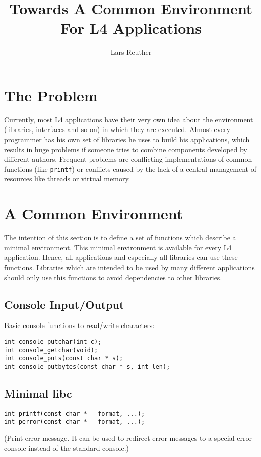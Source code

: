 \documentclass[twocolumn,10pt]{article}
\title{Towards A Common Environment For L4 Applications}
\author{Lars Reuther}
\date{}
\begin{document}
\maketitle

\section{The Problem}

Currently, most L4 applications have their very own idea about the
environment (libraries, interfaces and so on) in which they are
executed. Almost every programmer has his own set of libraries he uses
to build his applications, which results in huge problems if someone
tries to combine components developed by different authors. Frequent
problems are conflicting implementations of common functions (like
{\tt printf}) or conflicts caused by the lack of a central management
of resources like threads or virtual memory. 
  
\section{A Common Environment}

The intention of this section is to define a set of functions which
describe a minimal environment. This minimal environment is available
for every L4 application. Hence, all applications and especially all
libraries can use these functions. Libraries which are intended to be
used by many different applications should only use this functions to
avoid dependencies to other libraries.

\subsection{Console Input/Output}

Basic console functions to read/write characters:
\begin{Verbatim}[fontsize=\small]
int console_putchar(int c);
int console_getchar(void);
int console_puts(const char * s);
int console_putbytes(const char * s, int len);
\end{Verbatim}

\subsection{Minimal libc}

\begin{Verbatim}[fontsize=\small]
int printf(const char * __format, ...);
int perror(const char * __format, ...);
\end{Verbatim}
(Print error message. It can be used to redirect error messages to a
special error console instead of the standard console.)
\end{document}
